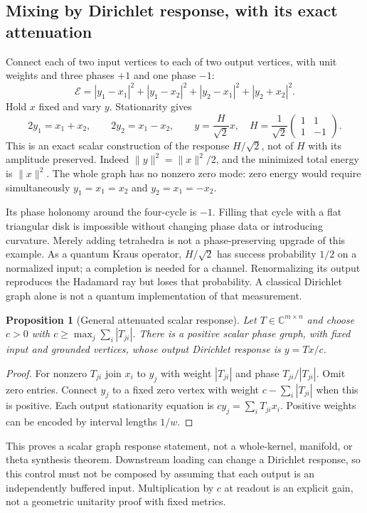 \documentclass[11pt]{article}
\newtheorem{proposition}[theorem]{Proposition}
\theoremstyle{definition}
\newcommand{\C}{\mathbb C}
\begin{document}
\subsection{Mixing by Dirichlet response, with its exact attenuation}
Connect each of two input vertices to each of two output vertices,
with unit weights and three phases $+1$ and one phase $-1$:
\begin{equation}\label{eq:mixenergy}
 \mathcal E=
 |y_1-x_1|^2+|y_1-x_2|^2+
 |y_2-x_1|^2+|y_2+x_2|^2.
\end{equation}
Hold $x$ fixed and vary $y$. Stationarity gives
\[
 2y_1=x_1+x_2,\qquad 2y_2=x_1-x_2,\qquad
 y=\frac{H}{\sqrt2}x,\quad
 H=\frac1{\sqrt2}\begin{pmatrix}1&1\\1&-1\end{pmatrix}.
\]
This is an exact scalar construction of the response $H/\sqrt2$,
not of $H$ with its amplitude preserved. Indeed
$\|y\|^2=\|x\|^2/2$, and the minimized total energy is $\|x\|^2$.
The whole graph has no nonzero zero mode: zero energy would require
simultaneously $y_1=x_1=x_2$ and $y_2=x_1=-x_2$.

Its phase holonomy around the four-cycle is $-1$. Filling that cycle
with a flat triangular disk is impossible without changing phase data
or introducing curvature. Merely adding tetrahedra is not a
phase-preserving upgrade of this example.
As a quantum Kraus operator, $H/\sqrt2$ has success probability $1/2$
on a normalized input; a completion is needed for a channel.
Renormalizing its output reproduces the Hadamard ray but loses that
probability. A classical Dirichlet graph alone is not a quantum
implementation of that measurement.

\begin{proposition}[General attenuated scalar response]\label{prop:attenuation}
Let $T\in\C^{m\times n}$ and choose
$c>0$ with $c\ge\max_j\sum_i|T_{ji}|$.
There is a positive scalar phase graph, with fixed input and grounded
vertices, whose output Dirichlet response is $y=Tx/c$.
\end{proposition}
\begin{proof}
For nonzero $T_{ji}$ join $x_i$ to $y_j$ with weight $|T_{ji}|$
and phase $T_{ji}/|T_{ji}|$. Omit zero entries. Connect $y_j$ to a fixed
zero vertex with weight $c-\sum_i|T_{ji}|$ when this is positive.
Each output stationarity equation is $cy_j=\sum_iT_{ji}x_i$.
Positive weights can be encoded by interval lengths $1/w$.
\end{proof}
This proves a scalar graph response statement, not a whole-kernel,
manifold, or theta synthesis theorem. Downstream loading can change
a Dirichlet response, so this control must not be composed by assuming
that each output is an independently buffered input.
Multiplication by $c$ at readout is an explicit gain, not a geometric
unitarity proof with fixed metrics.
\end{document}
